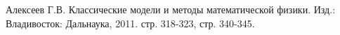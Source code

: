 \begin{thebibliography}{9}
        Алексеев Г.В. Классические модели и методы математической физики. Изд.: Владивосток: Дальнаука, 2011. стр. 318-323, стр. 340-345.

\end{thebibliography}